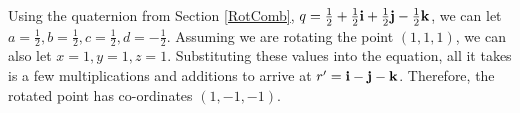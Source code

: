 \documentclass[10pt]{article}
\begin{document}
Using the quaternion from Section \ref{RotComb}, $q = \frac{1}{2} + \frac{1}{2}\vb{i} + \frac{1}{2}\vb{j} - \frac{1}{2}\vb{k}$, we can let $a = \frac{1}{2}, b = \frac{1}{2}, c = \frac{1}{2}, d = -\frac{1}{2}$. Assuming we are rotating the point $(1,1,1)$, we can also let $x = 1, y = 1, z = 1$. Substituting these values into the equation, all it takes is a few multiplications and additions to arrive at $r' = \vb{i} - \vb{j} - \vb{k}$. Therefore, the rotated point has co-ordinates $(1, -1, -1)$.

\printbibliography
\end{document}
